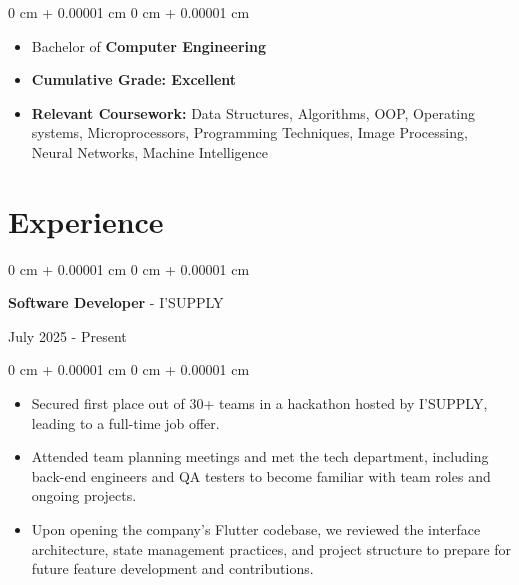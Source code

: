 \documentclass[10pt, letterpaper]{article}
\newenvironment{highlights}{
\begin{itemize}[
topsep=0.10 cm,
parsep=0.10 cm,
partopsep=0pt,
itemsep=0pt,
leftmargin=0 cm + 10pt
]
}{
\end{itemize}
} %
\newenvironment{onecolentry}{
\begin{adjustwidth}{
0 cm + 0.00001 cm
}{
0 cm + 0.00001 cm
}
}{
\end{adjustwidth}
} %
\newenvironment{twocolentry}[2][]{
\onecolentry
\def\secondColumn{#2}
\setcolumnwidth{\fill, 4.5 cm}
\begin{paracol}{2}
}{
\switchcolumn \raggedleft \secondColumn
\end{paracol}
\endonecolentry
} %
\begin{document}
\vspace{0.10cm}

\begin{onecolentry}
\begin{highlights}
\item
Bachelor of \textbf{Computer Engineering }


\item
\textbf{Cumulative Grade: Excellent}

\item
\textbf{Relevant Coursework:} Data Structures, Algorithms, OOP, Operating systems, Microprocessors, Programming Techniques, Image Processing, Neural Networks, Machine Intelligence

\end{highlights}
\end{onecolentry}




\section{Experience}
\vspace{0.1cm}
\begin{twocolentry}{
July 2025 - Present
}
\textbf{\large Software Developer} - I'SUPPLY
\end{twocolentry}
\vspace{0.1 cm}

\begin{onecolentry}
\begin{highlights}
\item
Secured first place out of 30+ teams in a hackathon hosted by I’SUPPLY, leading to a full-time job offer.
\item
Attended team planning meetings and met the tech department, including back-end engineers and QA testers to become familiar with team roles and ongoing projects.
\item
Upon opening the company's Flutter codebase, we reviewed the interface architecture, state management practices, and project structure to prepare for future feature development and contributions.
\end{highlights}
\end{onecolentry}
\end{document}

